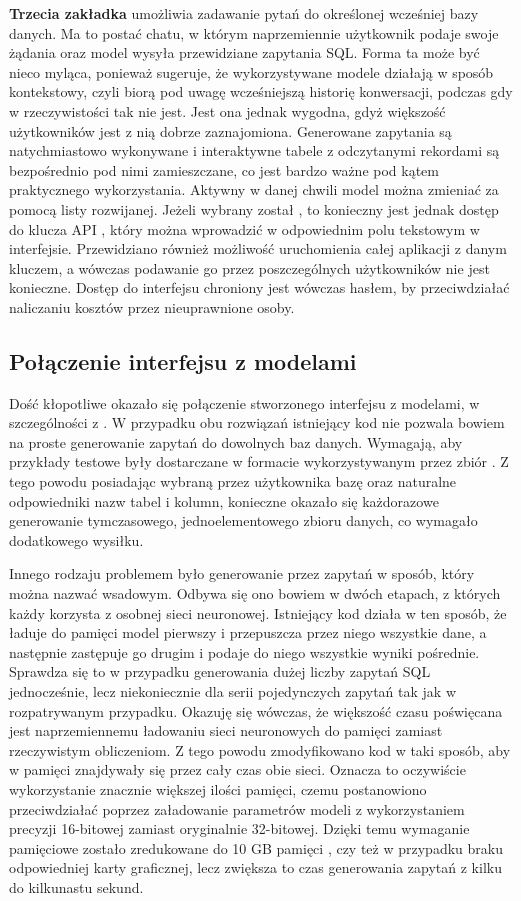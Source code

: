 \textbf{Trzecia zakładka} umożliwia zadawanie pytań do określonej wcześniej bazy danych. Ma to postać chatu, w którym naprzemiennie użytkownik podaje swoje żądania oraz model wysyła przewidziane zapytania SQL. Forma ta może być nieco myląca, ponieważ sugeruje, że wykorzystywane modele działają w sposób kontekstowy, czyli biorą pod uwagę wcześniejszą historię konwersacji, podczas gdy w rzeczywistości tak nie jest. Jest ona jednak wygodna, gdyż większość użytkowników jest z nią dobrze zaznajomiona. Generowane zapytania są natychmiastowo wykonywane i interaktywne tabele z odczytanymi rekordami są bezpośrednio pod nimi zamieszczane, co jest bardzo ważne pod kątem praktycznego wykorzystania. Aktywny w danej chwili model można zmieniać za pomocą listy rozwijanej. Jeżeli wybrany został , to konieczny jest jednak dostęp do klucza API , który można wprowadzić w odpowiednim polu tekstowym w interfejsie. Przewidziano również możliwość uruchomienia całej aplikacji z danym kluczem, a wówczas podawanie go przez poszczególnych użytkowników nie jest konieczne. Dostęp do interfejsu chroniony jest wówczas hasłem, by przeciwdziałać naliczaniu kosztów przez nieuprawnione osoby.

\subsection{Połączenie interfejsu z modelami}
Dość kłopotliwe okazało się połączenie stworzonego interfejsu z modelami, w szczególności z . W przypadku obu rozwiązań istniejący kod nie pozwala bowiem na proste generowanie zapytań do dowolnych baz danych. Wymagają, aby przykłady testowe były dostarczane w formacie wykorzystywanym przez zbiór . Z tego powodu posiadając wybraną przez użytkownika bazę oraz naturalne odpowiedniki nazw tabel i kolumn, konieczne okazało się każdorazowe generowanie tymczasowego, jednoelementowego zbioru danych, co wymagało dodatkowego wysiłku.

Innego rodzaju problemem było generowanie przez  zapytań w sposób, który można nazwać wsadowym. Odbywa się ono bowiem w dwóch etapach, z których każdy korzysta z osobnej sieci neuronowej. Istniejący kod działa w ten sposób, że ładuje do pamięci model pierwszy i przepuszcza przez niego wszystkie dane, a następnie zastępuje go drugim i podaje do niego wszystkie wyniki pośrednie. Sprawdza się to w przypadku generowania dużej liczby zapytań SQL jednocześnie, lecz niekoniecznie dla serii pojedynczych zapytań tak jak w rozpatrywanym przypadku. Okazuję się wówczas, że większość czasu poświęcana jest naprzemiennemu ładowaniu sieci neuronowych do pamięci zamiast rzeczywistym obliczeniom. Z tego powodu zmodyfikowano kod w taki sposób, aby w pamięci znajdywały się przez cały czas obie sieci. Oznacza to oczywiście wykorzystanie znacznie większej ilości pamięci, czemu postanowiono przeciwdziałać poprzez załadowanie parametrów modeli z wykorzystaniem precyzji 16-bitowej zamiast oryginalnie 32-bitowej. Dzięki temu wymaganie pamięciowe zostało zredukowane do 10 GB pamięci , czy też  w przypadku braku odpowiedniej karty graficznej, lecz zwiększa to czas generowania zapytań z kilku do kilkunastu sekund.

